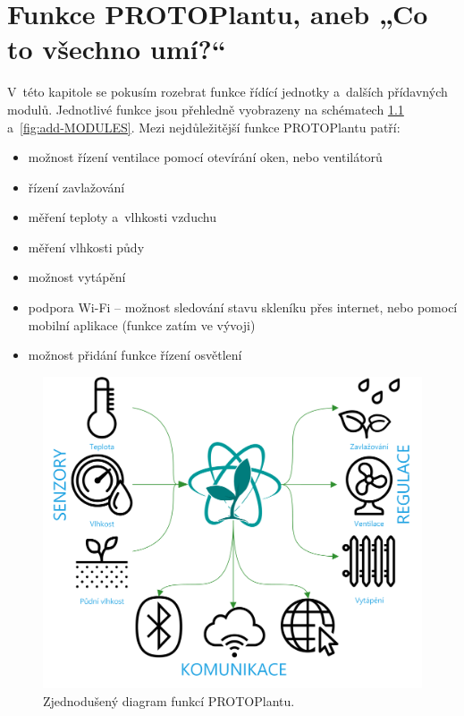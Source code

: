 \chapter{Funkce PROTOPlantu, aneb „Co to všechno umí?“}
V~této kapitole se pokusím rozebrat funkce řídící jednotky a~dalších přídavných modulů.
Jednotlivé funkce jsou přehledně vyobrazeny na schématech \ref{fig:FEATURES_WHOLE_SMALL} a~\ref{fig:add-MODULES}.
Mezi nejdůležitější funkce PROTOPlantu patří:
\begin{itemize}
    \item možnost řízení ventilace pomocí otevírání oken, nebo ventilátorů
    \item řízení zavlažování
    \item měření teploty a~vlhkosti vzduchu
    \item měření vlhkosti půdy
    \item možnost vytápění
    \item podpora Wi-Fi -- možnost sledování stavu skleníku přes internet, nebo pomocí mobilní aplikace (funkce zatím ve vývoji)
    \item možnost přidání funkce řízení osvětlení
\end{itemize}

\begin{figure}[htbp]
    \centering
    \includegraphics[scale=0.9]{img/FUNCTIONS/PROTOPLANT_FC.png}
    \caption{Zjednodušený diagram funkcí PROTOPlantu.}
    \label{fig:FEATURES_WHOLE_SMALL}
\end{figure}

